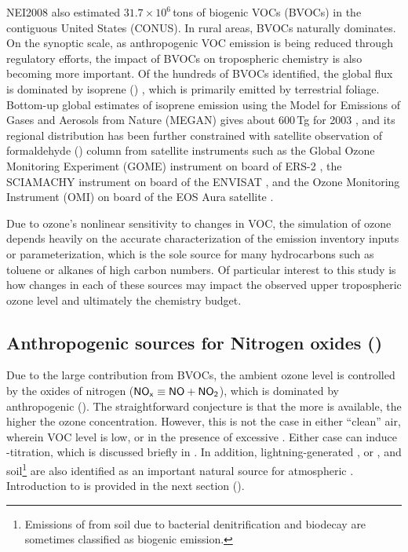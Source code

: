 	NEI2008 also estimated $31.7\times10^6$\,\unit{tons} of biogenic VOCs (BVOCs) in the contiguous United States (CONUS). In rural areas, BVOCs naturally dominates. On the synoptic scale, as anthropogenic VOC emission is being reduced through regulatory efforts, the impact of BVOCs on tropospheric chemistry is also becoming more important. Of the hundreds of BVOCs identified, the global flux is dominated by isoprene () \citep{Guenther:2006kl}, which is primarily emitted by terrestrial foliage. Bottom-up global estimates of isoprene emission using the Model for Emissions of Gases and Aerosols from Nature (MEGAN) gives about 600\,\unit{Tg} for 2003 \citep{Guenther:2006kl}, and its regional distribution has been further constrained with satellite observation of formaldehyde () column from satellite instruments such as the Global Ozone Monitoring Experiment (GOME) instrument on board of ERS-2 \citep{Palmer:2001nx, Palmer:2003cr,Palmer:2006qf},  the SCIAMACHY instrument on board of the ENVISAT  \citep{Dufour:2009fk, De-Smedt:2008uq, De-Smedt:2010kx}, and the Ozone Monitoring Instrument (OMI) on board of the EOS Aura satellite \citep{Millet:2008oq, Marais:2012kl}.

	Due to ozone's nonlinear sensitivity to changes in VOC, the simulation of ozone depends heavily on the accurate characterization of the emission inventory inputs or parameterization, which is the sole source for many hydrocarbons such as toluene or alkanes of high carbon numbers. Of particular interest to this study is how changes in each of these sources may impact the observed upper tropospheric ozone level and ultimately the chemistry budget.


\subsection{Anthropogenic sources for Nitrogen oxides (\anox)} \label{ssec:intro/ozone/nox}

	Due to the large contribution from BVOCs, the ambient ozone level is controlled by the oxides of nitrogen ($\chem{NO_x}\equiv\chem{NO}+\chem{NO_2}$), which is dominated by anthropogenic  (\anox). The straightforward conjecture is that the more  is available, the higher the ozone concentration. However, this is not the case in either ``clean'' air, wherein VOC level is low, or in the presence of excessive . Either case can induce -titration, which is discussed briefly in . In addition, lightning-generated , or {\lnox}, and soil\footnote{Emissions of  from soil due to bacterial denitrification and biodecay are sometimes classified as biogenic emission.}  are also identified as an important natural source for atmospheric . Introduction to {\lnox} is provided in the next section ().

